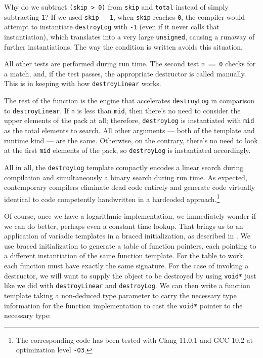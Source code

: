 Why do we subtract \lstinline!(skip!~\lstinline!>!~\lstinline!0)! from
\lstinline!skip! and \lstinline!total! instead of simply subtracting
\lstinline!1!? If we used \lstinline!skip!~\lstinline!-!~\lstinline!1!, when
\lstinline!skip! reaches \lstinline!0!, the compiler would attempt to
instantiate \lstinline!destroyLog! with \lstinline!-1! (even if it never calls
that instantiation), which translates into a very large
\lstinline!unsigned!, causing a runaway of further instantiations. The way
the condition is written avoids this situation.

All other tests are performed during run time. The second test
\lstinline!n!~\lstinline!==!~\lstinline!0! checks for a match, and, if the test
passes, the appropriate destructor is called manually. This is in
keeping with how \lstinline!destroyLinear! works.

The rest of the function is the engine that accelerates
\lstinline!destroyLog! in comparison to\linebreak%
 \lstinline!destroyLinear!. If
\lstinline!n! is less than \lstinline!mid!, then there's no need to consider
the upper elements of the pack at all; therefore, \lstinline!destroyLog! is
instantiated with \lstinline!mid! as the total elements to search. All
other arguments --- both of the template and runtime kind --- are the
same. Otherwise, on the contrary, there's no need to look at the first
\lstinline!mid! elements of the pack, so \lstinline!destroyLog! is
instantiated accordingly.

All in all, the \lstinline!destroyLog! template compactly encodes a linear
search during compilation and simultaneously a binary search during run
time. As expected, contemporary compilers eliminate dead code entirely
and generate code virtually identical to code competently handwritten in
a hardcoded approach.{\cprotect\footnote{The corresponding code has been
tested with Clang 11.0.1 and GCC 10.2 at optimization level
  \lstinline!-O3!.}}

Of course, once we have a logarithmic implementation, we immediately
wonder if we can do better, perhaps even a constant time lookup. That
brings us to an application of variadic templates in a braced
initialization, as described in . We use braced
initialization to generate a table of function pointers, each pointing
to a different instantiation of the same function template. For the
table to work, each function must have exactly the same signature. For
the case of invoking a destructor, we will want to supply the object to
be destroyed by using \lstinline!void*! just like we did with
\lstinline!destroyLinear! and \lstinline!destroyLog!. We can then write a
function template taking a non-deduced type parameter to carry the
necessary type information for the function implementation to cast the
\lstinline!void*! pointer to the necessary type:

